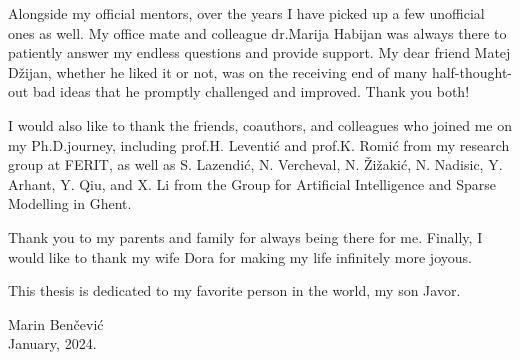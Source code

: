 \begin{acknowledgements}
Alongside my official mentors, over the years I have picked up a few unofficial ones as well. My office mate and colleague dr.\@ Marija Habijan was always there to patiently answer my endless questions and provide support. My dear friend Matej Džijan, whether he liked it or not, was on the receiving end of many half-thought-out bad ideas that he promptly challenged and improved. Thank you both!

I would also like to thank the friends, coauthors, and colleagues who joined me on my Ph.D.\@ journey, including prof.\@ H. Leventić and prof.\@ K. Romić from my research group at FERIT, as well as S. Lazendić, N. Vercheval, N. Žižakić, N. Nadisic, Y. Arhant, Y. Qiu, and X. Li from the Group for Artificial Intelligence and Sparse Modelling in Ghent.

Thank you to my parents and family for always being there for me. Finally, I would like to thank my wife Dora for making my life infinitely more joyous. 

This thesis is dedicated to my favorite person in the world, my son Javor.

\setlength{\epigraphwidth}{0.3\textwidth}
\renewcommand{\epigraphflush}{flushright}
 \epigraph{
Marin Benčević\\
January, 2024.
}{}
\end{acknowledgements}
